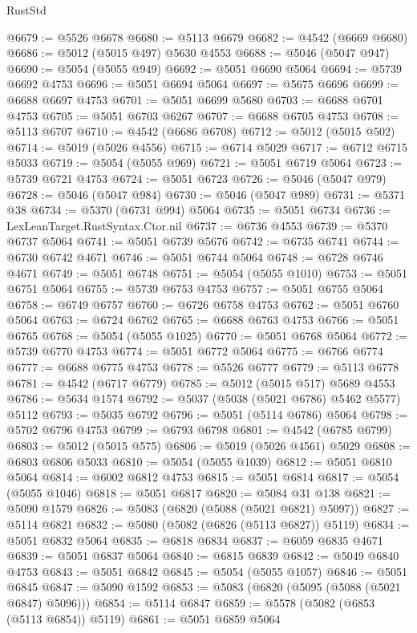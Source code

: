\begin{lexlean}{RustStd}
\begin{coremodule}
@6679 := @5526 @6678
@6680 := @5113 @6679
@6682 := @4542 (@6669 @6680)
@6686 := @5012 (@5015 @497) @5630 @4553
@6688 := @5046 (@5047 @947)
@6690 := @5054 (@5055 @949)
@6692 := @5051 @6690 @5064
@6694 := @5739 @6692 @4753
@6696 := @5051 @6694 @5064
@6697 := @5675 @6696
@6699 := @6688 @6697 @4753
@6701 := @5051 @6699 @5680
@6703 := @6688 @6701 @4753
@6705 := @5051 @6703 @6267
@6707 := @6688 @6705 @4753
@6708 := @5113 @6707
@6710 := @4542 (@6686 @6708)
@6712 := @5012 (@5015 @502)
@6714 := @5019 (@5026 @4556)
@6715 := @6714 @5029
@6717 := @6712 @6715 @5033
@6719 := @5054 (@5055 @969)
@6721 := @5051 @6719 @5064
@6723 := @5739 @6721 @4753
@6724 := @5051 @6723
@6726 := @5046 (@5047 @979)
@6728 := @5046 (@5047 @984)
@6730 := @5046 (@5047 @989)
@6731 := @5371 @38
@6734 := @5370 (@6731 @994) @5064
@6735 := @5051 @6734
@6736 := LexLeanTarget.RustSyntax.Ctor.nil
@6737 := @6736 @4553
@6739 := @5370 @6737 @5064
@6741 := @5051 @6739 @5676
@6742 := @6735 @6741
@6744 := @6730 @6742 @4671
@6746 := @5051 @6744 @5064
@6748 := @6728 @6746 @4671
@6749 := @5051 @6748
@6751 := @5054 (@5055 @1010)
@6753 := @5051 @6751 @5064
@6755 := @5739 @6753 @4753
@6757 := @5051 @6755 @5064
@6758 := @6749 @6757
@6760 := @6726 @6758 @4753
@6762 := @5051 @6760 @5064
@6763 := @6724 @6762
@6765 := @6688 @6763 @4753
@6766 := @5051 @6765
@6768 := @5054 (@5055 @1025)
@6770 := @5051 @6768 @5064
@6772 := @5739 @6770 @4753
@6774 := @5051 @6772 @5064
@6775 := @6766 @6774
@6777 := @6688 @6775 @4753
@6778 := @5526 @6777
@6779 := @5113 @6778
@6781 := @4542 (@6717 @6779)
@6785 := @5012 (@5015 @517) @5689 @4553
@6786 := @5634 @1574
@6792 := @5037 (@5038 (@5021 @6786) @5462 @5577) @5112
@6793 := @5035 @6792
@6796 := @5051 (@5114 @6786) @5064
@6798 := @5702 @6796 @4753
@6799 := @6793 @6798
@6801 := @4542 (@6785 @6799)
@6803 := @5012 (@5015 @575)
@6806 := @5019 (@5026 @4561) @5029
@6808 := @6803 @6806 @5033
@6810 := @5054 (@5055 @1039)
@6812 := @5051 @6810 @5064
@6814 := @6002 @6812 @4753
@6815 := @5051 @6814
@6817 := @5054 (@5055 @1046)
@6818 := @5051 @6817
@6820 := @5084 @31 @138
@6821 := @5090 @1579
@6826 := @5083 (@6820 (@5088 (@5021 @6821) @5097))
@6827 := @5114 @6821
@6832 := @5080 (@5082 (@6826 (@5113 @6827)) @5119)
@6834 := @5051 @6832 @5064
@6835 := @6818 @6834
@6837 := @6059 @6835 @4671
@6839 := @5051 @6837 @5064
@6840 := @6815 @6839
@6842 := @5049 @6840 @4753
@6843 := @5051 @6842
@6845 := @5054 (@5055 @1057)
@6846 := @5051 @6845
@6847 := @5090 @1592
@6853 := @5083 (@6820 (@5095 (@5088 (@5021 @6847) @5096)))
@6854 := @5114 @6847
@6859 := @5578 (@5082 (@6853 (@5113 @6854)) @5119)
@6861 := @5051 @6859 @5064

\end{coremodule}
\end{lexlean}
